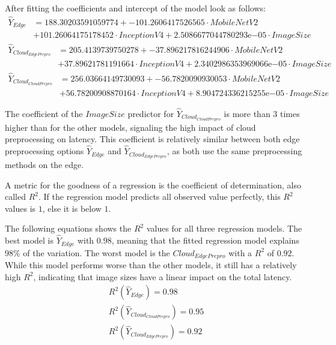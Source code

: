 After fitting the coefficients and intercept of the model look as follows:
\begin{equation*}
\begin{split}
\hat{Y}_{Edge} &= 188.30203591059774 + -101.2606417526565\cdot MobileNetV2 \\
&+ 101.26064175178452\cdot InceptionV4+2.5086677044780293\mathrm{e}{-05}\cdot ImageSize
\end{split}
\end{equation*}
\begin{equation*}
\begin{split}
\hat{Y}_{Cloud_{EdgePrepro}} &= 
205.4139739750278 + -37.896217816244906\cdot MobileNetV2\\
&+ 37.89621781191664\cdot InceptionV4+2.3402986353969066\mathrm{e}{-05}\cdot ImageSize
\end{split}
\end{equation*}
\begin{equation*}
\begin{split}
\hat{Y}_{Cloud_{CloudPrepro}} &= 
256.03664149730093 + -56.7820090930053\cdot MobileNetV2\\
&+ 56.78200908870164\cdot InceptionV4+8.904724336215255\mathrm{e}{-05}\cdot ImageSize
\end{split}
\end{equation*}

The coefficient of the $ImageSize$ predictor for $\hat{Y}_{Cloud_{CloudPrepro}}$ is more than $3$ times higher than for the other models, signaling the high impact of cloud preprocessing on latency.
This coefficient is relatively similar between both edge preprocessing options $\hat{Y}_{Edge}$ and $\hat{Y}_{Cloud_{EdgePrepro}}$, as both use the same preprocessing methods on the edge.


A metric for the goodness of a regression is the coefficient of determination, also called $R^2$.
If the regression model predicts all observed value perfectly, this $R^2$ values is $1$, else it is below $1$.

The following equations shows the $R^2$ values for all three regression models.
The best model is $\hat{Y}_{Edge}$ with $0.98$, meaning that the fitted regression model explains $98\%$ of the variation.
The worst model is the $Cloud_{EdgePrepro}$ with a $R^2$ of $0.92$.
While this model performs worse than the other models, it still has a relatively high $R^2$, indicating that  image sizes have a linear impact on the total latency.
\begin{equation*}
\begin{split}
R^2(\hat{Y}_{Edge}) = 0.98\\
R^2(\hat{Y}_{Cloud_{CloudPrepro}}) = 0.95\\
R^2(\hat{Y}_{Cloud_{EdgePrepro}}) = 0.92
\end{split}
\end{equation*}

